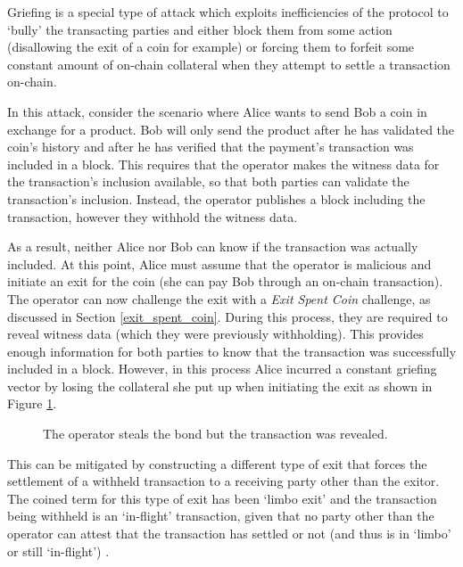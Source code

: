 Griefing is a special type of attack which exploits inefficiencies of
the protocol to `bully' the transacting parties and either block them from some action
(disallowing the exit of a coin for example) or forcing them to forfeit some
constant amount of on-chain collateral when they attempt to settle a
transaction on-chain. 

In this attack, consider the scenario where Alice wants to send Bob a coin in
exchange for a product. Bob will only send the product after he has validated
the coin's history and after he has verified that the payment's transaction was included in a block.
This requires that the operator makes the witness data for the transaction's inclusion available, so that both parties can validate the transaction's inclusion.
Instead, the operator publishes a block including the transaction, however they withhold the witness data.

As a result, neither Alice nor Bob can know if the transaction was actually included. At this point, Alice must assume that the operator is malicious and initiate an exit for the coin (she can pay Bob through an on-chain transaction). The operator can now challenge the exit with a \textit{Exit Spent Coin}
challenge, as discussed in Section \ref{exit_spent_coin}. During this process,
they are required to reveal witness data (which they were previously
withholding). This provides enough information for both parties to know that the transaction
was successfully included in a block. However, in this process Alice incurred a constant griefing vector by losing the collateral she put up when initiating the exit as shown in Figure \ref{fig:griefing_withhold}.

\begin{figure}[H]
	\caption{
        The operator steals the bond but the transaction was revealed.
    }
    \label{fig:griefing_withhold}
\end{figure}

This can be mitigated by constructing a different type of exit that forces the
settlement of a withheld transaction to a receiving party other than the exitor. The
coined term for this type of exit has been `limbo exit' and the transaction
being withheld is an `in-flight' transaction, given that no party other than
the operator can attest that the transaction has settled or not (and thus is in
`limbo' or still `in-flight') \cite{limbo_exit}.

